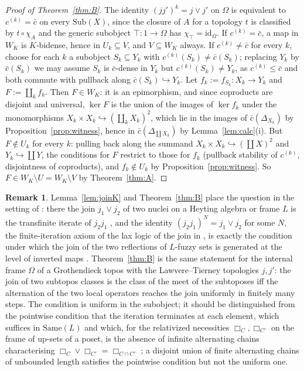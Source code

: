 \documentclass[11pt]{amsart}
\theoremstyle{definition}
\newtheorem{rem}[thm]{Remark}
\newcommand{\Same}{\mathrm{Same}}
\newcommand{\Sub}{\mathrm{Sub}}
\begin{document}
\begin{proof}[Proof of Theorem~\ref{thm:B}]
The identity $(jj')^k=j\vee j'$ on $\Omega$ is equivalent to
$c^{(k)}=\bar c$ on every $\Sub(X)$, since the closure of $A$ for a topology
$t$ is classified by $t\circ\chi_A$ and the generic subobject
$\top\colon1\to\Omega$ has $\chi_\top=\mathrm{id}_\Omega$. If $c^{(k)}=\bar c$,
a map in $W_K$ is $K$-bidense, hence in $U_k\subseteq V$, and $V\subseteq
W_K$ always. If $c^{(k)}\ne\bar c$ for every $k$, choose for each $k$ a
subobject $S_k\subseteq Y_k$ with $c^{(k)}(S_k)\ne\bar c(S_k)$; replacing
$Y_k$ by $\bar c(S_k)$ we may assume $S_k$ is $\bar c$-dense in $Y_k$ but
$c^{(k)}(S_k)\ne Y_k$, as $c^{(k)}\le\bar c$ and both commute with pullback
along $\bar c(S_k)\hookrightarrow Y_k$. Let $f_k:=f_{S_k}\colon X_k\to Y_k$ and
$F:=\coprod_kf_k$. Then $F\in W_K$: it is an epimorphism, and since
coproducts are disjoint and universal, $\ker F$ is the union of the images
of $\ker f_k$ under the monomorphisms $X_k\times X_k\hookrightarrow
(\coprod_kX_k)^2$, which lie in the images of $\bar c(\Delta_{X_k})$ by
Proposition~\ref{prop:witness}, hence in $\bar c(\Delta_{\coprod X_k})$ by
Lemma~\ref{lem:calc}(i). But $F\notin U_k$ for every $k$: pulling back
along the summand $X_k\times X_k\hookrightarrow(\coprod X)^2$ and
$Y_k\hookrightarrow\coprod Y$, the conditions for $F$ restrict to those for
$f_k$ (pullback stability of $c^{(k)}$, disjointness of coproducts), and
$f_k\notin U_k$ by Proposition~\ref{prop:witness}. So $F\in W_K\setminus U=
W_K\setminus V$ by Theorem~\ref{thm:A}.
\end{proof}

\begin{rem}
Lemma~\ref{lem:joinK} and Theorem~\ref{thm:B} place the question in the
setting of \cite{Laxjoin,Fuzzysame}: there the join $j_1\vee j_2$ of two
nuclei on a Heyting algebra or frame $L$ is the transfinite iterate of
$j_2j_1$ \cite{Escardo}, and the identity $(j_2j_1)^N=j_1\vee j_2$ for some
$N$, the finite-iteration axiom of the lax logic of the join in
\cite{Laxjoin}, is exactly the condition under which the join of the two
reflections of $L$-fuzzy sets is generated at the level of inverted maps
\cite[Cor.~4.3]{Fuzzysame}. Theorem~\ref{thm:B} is the same statement for
the internal frame $\Omega$ of a Grothendieck topos with the
Lawvere--Tierney topologies $j,j'$: the join of two subtopos classes is the
class of the meet of the subtoposes iff the alternation of the two local
operators reaches the join uniformly in finitely many steps. The condition
is uniform in the subobject; it should be distinguished from the pointwise
condition that the iteration terminates at each element, which suffices in
$\Same(L)$ \cite{Fuzzysame} and which, for the relativized necessities
$\Box_C,\Box_{C'}$ on the frame of up-sets of a poset, is the absence of
infinite alternating chains characterising $\Box_C\vee\Box_{C'}=
\Box_{C\cap C'}$ \cite{Relnec}; a disjoint union of finite alternating chains
of unbounded length satisfies the pointwise condition but not the uniform
one.
\end{rem}
\end{document}
